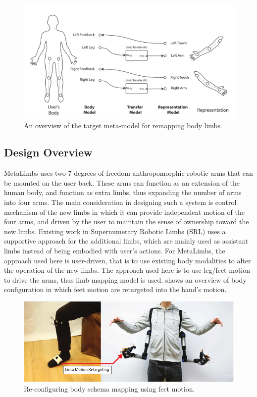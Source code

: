 \begin{figure}[t!]
  \centering
  \includegraphics[width=0.95\linewidth]{figures/eval/EDD/EDD-Meta.pdf}
  \captionsetup{justification=centering}
  \caption{An overview of the target meta-model for remapping body limbs.}
  \label{fig:eval-EDD-ML}
\end{figure}

\subsection{Design Overview}

MetaLimbs uses two 7 degrees of freedom anthropomorphic robotic arms that can be mounted on the user back. These arms can function as an extension of the human body, and function as extra limbs, thus expanding the number of arms into four arms. The main consideration in designing such a system is control mechanism of the new limbs in which it can provide independent motion of the four arms, and driven by the user to maintain the sense of ownership toward the new limbs. Existing work in Supernumerary Robotic Limbs (SRL) \cite{parietti2016supernumerary} uses a supportive approach for the additional limbs, which are mainly used as assistant limbs instead of being embodied with user's actions. For MetaLimbs, the approach used here is user-driven, that is to use existing body modalities to alter the operation of the new limbs. The approach used here is to use leg/feet motion to drive the arms, thus limb mapping model is used.  shows an overview of body configuration in which feet motion are retargeted into the hand's motion.


\begin{figure}[t!]
  \centering
	  \includegraphics[width=1\linewidth]{figures/eval/MetaLimbs/MetaLimbsOverview.pdf}
  \captionsetup{justification=centering}
  \caption{Re-configuring body schema mapping using feet motion.}
  \label{fig:eval-metalimbs-system}
\end{figure}


